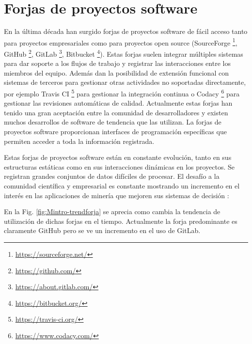 

\section{Forjas de proyectos software}


En la última década han surgido forjas de proyectos software de fácil acceso tanto para proyectos empresariales como para proyectos open source (SourceForge \footnote{\url{https://sourceforge.net/}}, GitHub \footnote{\url{https://github.com/}}, GitLab \footnote{\url{https://about.gitlab.com/}}, Bitbucket  \footnote{\url{https://bitbucket.org/}}).  Estas forjas suelen integrar múltiples sistemas para dar soporte a los flujos de trabajo y registrar las interacciones entre los miembros del equipo. Además dan la posibilidad de extensión funcional con sistemas de terceros para gestionar otras actividades no soportadas directamente, por ejemplo Travis CI
\footnote{\url{https://travis-ci.org/}} para gestionar la integración continua o Codacy \footnote{\url{https://www.codacy.com/}} para gestionar las revisiones automáticas de calidad. Actualmente estas forjas han tenido una gran aceptación entre la comunidad de desarrolladores y existen muchos desarrollos de software de tendencia que las utilizan. La forjas de proyectos software proporcionan interfaces de programación específicas que permiten acceder a toda la información registrada. 

Estas forjas de proyectos software están en constante evolución, tanto en sus estructuras estáticas como en sus interacciones dinámicas en los proyectos. Se registran grandes conjuntos de datos difíciles de procesar. El  desafío a la comunidad científica y empresarial  es constante mostrando un incremento en el interés en las aplicaciones de minería que mejoren sus sistemas de decisión \cite{Guemes-Pena2018}:

En la Fig. \ref{fig:Mintro-trendforja} se aprecia como cambia la tendencia de utilización de dichas forjas en el tiempo. Actualmente la forja predominante es claramente GitHub pero se ve un incremento en el uso de GitLab.

